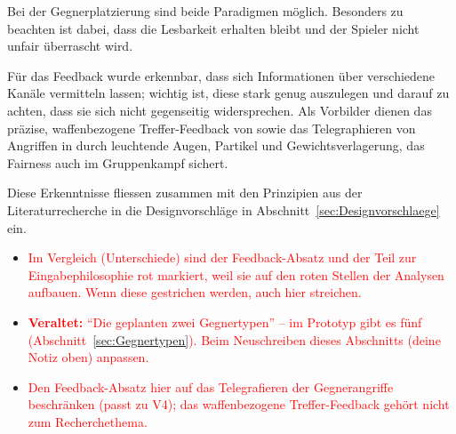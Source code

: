\documentclass[../Main.tex]{subfiles}
\begin{document}
Bei der Gegnerplatzierung sind beide Paradigmen möglich. Besonders zu beachten ist dabei, dass die Lesbarkeit erhalten bleibt und der Spieler nicht unfair überrascht wird.

Für das Feedback wurde erkennbar, dass sich Informationen über verschiedene Kanäle vermitteln lassen; wichtig ist, diese stark genug auszulegen und darauf zu achten, dass sie sich nicht gegenseitig widersprechen. Als Vorbilder dienen das präzise, waffenbezogene Treffer-Feedback von  sowie das Telegraphieren von Angriffen in  durch leuchtende Augen, Partikel und Gewichtsverlagerung, das Fairness auch im Gruppenkampf sichert.

Diese Erkenntnisse fliessen zusammen mit den Prinzipien aus der Literaturrecherche in die Designvorschläge in Abschnitt~\ref{sec:Designvorschlaege} ein.

\begin{itemize}[leftmargin=1.5cm]
    \item \textcolor{red}{Im Vergleich (Unterschiede) sind der Feedback-Absatz und der Teil zur Eingabephilosophie rot markiert, weil sie auf den roten Stellen der Analysen aufbauen. Wenn diese gestrichen werden, auch hier streichen.}
    \item \textcolor{red}{\textbf{Veraltet:} \enquote{Die geplanten zwei Gegnertypen} -- im Prototyp gibt es fünf (Abschnitt~\ref{sec:Gegnertypen}). Beim Neuschreiben dieses Abschnitts (deine Notiz oben) anpassen.}
    \item \textcolor{red}{Den Feedback-Absatz hier auf das Telegrafieren der Gegnerangriffe beschränken (passt zu V4); das waffenbezogene Treffer-Feedback gehört nicht zum Recherchethema.}
\end{itemize}
\end{document}
